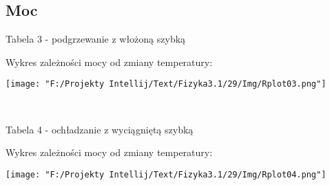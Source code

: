 \documentclass[11pt]{article}
\begin{document}
    \subsection*{Moc}
    \begin{center}
        Tabela 3 - podgrzewanie z włożoną szybką
    \end{center}
    \begin{center}
    \end{center}
    Wykres zależności mocy od zmiany temperatury:
    \begin{center}
        \texttt{[image: "F:/Projekty Intellij/Text/Fizyka3.1/29/Img/Rplot03.png"]}
    \end{center}
    \\
    \begin{center}
        Tabela 4 - ochładzanie z wyciągniętą szybką
    \end{center}
    \begin{center}
    \end{center}\newpage
    Wykres zależności mocy od zmiany temperatury:
    \begin{center}
        \texttt{[image: "F:/Projekty Intellij/Text/Fizyka3.1/29/Img/Rplot04.png"]}
    \end{center}

    \newpage
\end{document}
